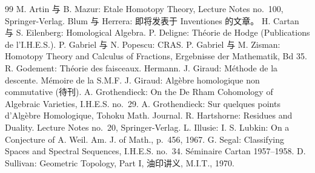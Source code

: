 \begin{thebibliography}{99}\pageoriginale
{} M. Artin 与 B. Mazur: Etale Homotopy Theory, Lecture Notes no.~100, Springer-Verlag.
 Blum 与 Herrera: 即将发表于 Inventiones 的文章。
 H. Cartan 与 S. Eilenberg: Homological Algebra.
 P. Deligne: Théorie de Hodge (Publications de l'I.H.E.S.).
 P. Gabriel 与 N. Popescu: CRAS.
 P. Gabriel 与 M. Zisman: Homotopy Theory and Calculus of
  Fractions, Ergebnisse der Mathematik, Bd 35.
 R. Godement: Théorie des faisceaux. Hermann.
 J. Giraud: Méthode de la descente. Mémoire de la S.M.F.
 J. Giraud: Algèbre homologique non commutative (待刊).
 A. Grothendieck: On the De Rham Cohomology of Algebraic
  Varieties, I.H.E.S. no.~29.
 A. Grothendieck: Sur quelques points d'Algèbre Homologique,
  Tohoku Math. Journal.
 R. Hartshorne: Residues and Duality. Lecture Notes
  no.~20, Springer-Verlag.
 L. Illusie:  I.
 S. Lubkin: On a Conjecture of A. Weil. Am. J. of
  Math., p.~456, 1967.
 G. Segal: Classifying Spaces and Spectral Sequences,
  I.H.E.S. no.~34.
 Séminaire Cartan 1957--1958.
 D. Sullivan: Geometric Topology, Part I, 油印讲义,
  M.I.T., 1970.
\end{thebibliography}

\ifx\danslelivre\undefined

\fi



